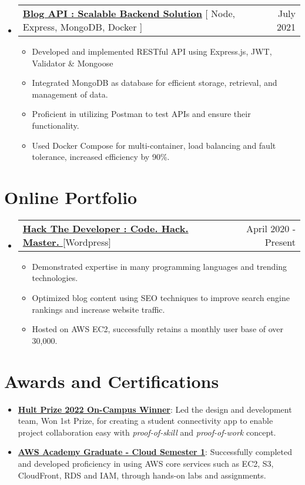 \documentclass[letterpaper,11pt]{article}
\makeatletter
\newcommand{\resumeItem}[1]{
  \item\small{
    {#1 \vspace{-2pt}}
  }
}
\newcommand{\resumeProjectHeading}[2]{
    \item
    \begin{tabular*}{0.97\textwidth}{l@{\extracolsep{\fill}}r}
      \small#1 & #2 \\
    \end{tabular*}\vspace{-7pt}
}
\newcommand{\resumeSubHeadingListStart}{\begin{itemize}[leftmargin=0.15in, label={}]}
\newcommand{\resumeSubHeadingListEnd}{\end{itemize}}
\newcommand{\resumeItemListStart}{\begin{itemize}}
\newcommand{\resumeItemListEnd}{\end{itemize}\vspace{-5pt}}
\makeatother
\begin{document}
    \resumeSubHeadingListStart
      \resumeProjectHeading
          {\textbf{\href{https://github.com/divshekhar/docker_node_api}{\textbf{Blog API : Scalable Backend Solution}}}{ [ Node, Express, MongoDB, Docker ]}}{July 2021}
          \resumeItemListStart
            \resumeItem{Developed and implemented RESTful API using Express.js, JWT, Validator \& Mongoose}
            \resumeItem{Integrated MongoDB as database for efficient storage, retrieval, and management of data.}
            \resumeItem{Proficient in utilizing Postman to test APIs and ensure their functionality.}
            \resumeItem{Used Docker Compose for multi-container, load balancing and fault tolerance, increased efficiency by 90\%.}
          \resumeItemListEnd
    \resumeSubHeadingListEnd

\section{Online Portfolio}

\resumeSubHeadingListStart
      \resumeProjectHeading
          {\textbf{\href{https://hackthedeveloper.com} {Hack The Developer : Code. Hack. Master. }}{[Wordpress]}}{ April 2020 - Present}
          \resumeItemListStart
           \resumeItem{Demonstrated expertise in many programming languages and trending technologies.}
           \resumeItem{Optimized blog content using SEO techniques to improve search engine rankings and increase website traffic.}
           \resumeItem{Hosted on AWS EC2, successfully retains a monthly user base of over 30,000.}
          \resumeItemListEnd
    \resumeSubHeadingListEnd

\section{Awards and Certifications}
 \begin{itemize}[leftmargin=0.15in, label={}]
    \small{\item{
        \resumeItemListStart
            \resumeItem{\textbf{\href{https://www.linkedin.com/posts/dshekhar17_hultprize2022-hultprizekiit-kiituniversity-activity-6899007358467743746-6hZ3}{Hult Prize 2022 On-Campus Winner}}: Led the design and development team, Won 1st Prize, for creating a student connectivity app to enable project collaboration easy with \textit{proof-of-skill} and \textit{proof-of-work} concept.}
            
      \resumeItemListEnd

      \resumeItemListStart
            \resumeItem{\textbf{\href{https://www.credly.com/go/vqTzHzec}{AWS Academy Graduate - Cloud Semester 1}}: Successfully completed and developed proficiency in using AWS core services such as EC2, S3, CloudFront, RDS and IAM, through hands-on labs and assignments.}
            
      \resumeItemListEnd
    }}
 \end{itemize}
\end{document}
